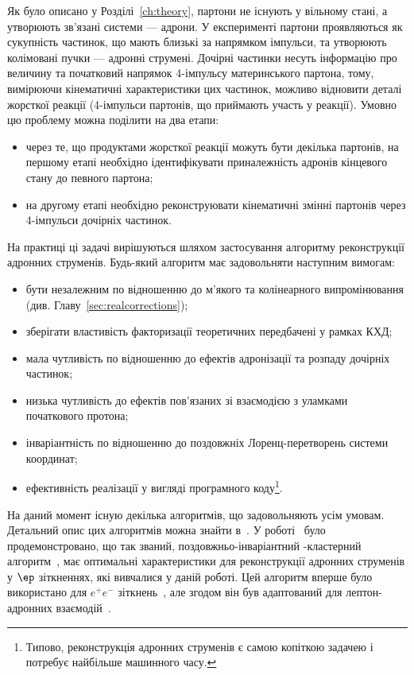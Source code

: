 Як було описано у Розділі~\ref{ch:theory}, партони не існують у вільному стані, а утворюють зв'язані системи --- адрони. У експерименті партони проявляються як сукупність частинок, що мають близькі за напрямком імпульси, та утворюють колімовані пучки --- адронні струмені. Дочірні частинки несуть інформацію про величину та початковий напрямок 4-імпульсу материнського партона, тому, вимірюючи кінематичні характеристики цих частинок, можливо відновити деталі жорсткої реакції (4-імпульси партонів, що приймають участь у реакції). Умовно цю проблему можна поділити на два етапи:
\begin{itemize}
	\item через те, що продуктами жорсткої реакції можуть бути декілька партонів, на першому етапі необхідно ідентифікувати приналежність адронів кінцевого стану до певного партона;
	\item на другому етапі необхідно реконструювати кінематичні змінні партонів через 4-імпульси дочірніх частинок.
\end{itemize}
На практиці ці задачі вирішуються шляхом застосування алгоритму реконструкції адронних струменів. Будь-який алгоритм має задовольняти наступним вимогам:
\begin{itemize}
	\item бути незалежним по відношенню до м'якого та колінеарного випромінювання (див. Главу~\ref{sec:realcorrections});
	\item зберігати властивість факторизації теоретичних передбачені у рамках КХД;
	\item мала чутливість по відношенню до ефектів адронізації та розпаду дочірніх частинок;
	\item низька чутливість до ефектів пов'язаних зі взаємодією з уламками початкового протона;
	\item інваріантність по відношенню до поздовжніх Лоренц-перетворень системи координат;
	\item ефективність реалізації у вигляді програмного коду\footnote{Типово, реконструкція адронних струменів є самою копіткою задачею і потребує найбільше машинного часу.}.
\end{itemize}
На даний момент існую декілька алгоритмів, що задовольняють усім умовам. Детальний опис цих алгоритмів можна знайти в~\cite{salam:antikt}. У роботі~\cite{claudia:antikt} було продемонстровано, що так званий, поздовжньо-інваріантний \kt-кластерний алгоритм~\cite{ktcatani}, має оптимальні характеристики для реконструкції адронних струменів у $\ep$ зіткненнях, які вивчалися у даній роботі. Цей алгоритм вперше було використано для $e^{+}e^{-}$ зіткнень~\cite{ktepcollisions}, але згодом він був адаптований для лептон-адронних взаємодій~\cite{ktclaudiaradiusdependence}. 

